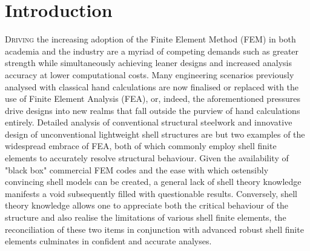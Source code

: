 


\chapter{Introduction}
\label{chap:chapter_1}

\renewcommand{\Thema}{Introduction}

\lettrine[lines=2]{D}{riving} the increasing adoption of the Finite Element Method (FEM) in both academia and the industry are a myriad of competing demands such as greater strength while simultaneously achieving leaner designs and increased analysis accuracy at lower computational costs. Many engineering scenarios previously analysed with classical hand calculations are now finalised or replaced with the use of Finite Element Analysis (FEA), or, indeed, the aforementioned pressures drive designs into new realms that fall outside the purview of hand calculations entirely. Detailed analysis of conventional structural steelwork and innovative design of unconventional lightweight shell structures are but two examples of the widespread embrace of FEA, both of which commonly employ shell finite elements to accurately resolve structural behaviour. Given the availability of "black box" commercial FEM codes and the ease with which ostensibly convincing shell models can be created, a general lack of shell theory knowledge manifests a void subsequently filled with questionable results. Conversely, shell theory knowledge allows one to appreciate both the critical behaviour of the structure and also realise the limitations of various shell finite elements, the reconciliation of these two items in conjunction with advanced robust shell finite elements culminates in confident and accurate analyses.

